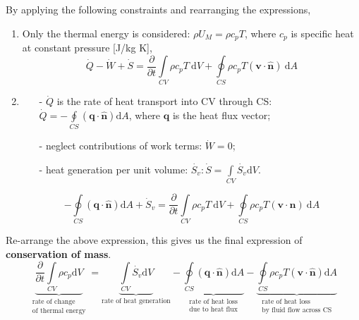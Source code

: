 \documentclass[12pt, a4paper]{article}
\begin{document}
By applying the following constraints and rearranging the expressions,
\begin{enumerate}
    \item Only the thermal energy is considered: $\rho U_{M} = \rho c_{p} T$, where $c_{p}$ is specific heat at constant pressure [J/kg K],
    \[
        \dot{Q}-\dot{W}+\dot{S} = \frac{\partial}{\partial t} \int\limits_{CV} \rho c_p T \ \mathrm{d}V +  \oint\limits_{CS} \rho c_p T (\bm{v} \cdot \bm{\hat{n}}) \ \mathrm{d}A
    \]
    
    \item \begin{itemize}
        \item[-] $\dot{Q}$ is the rate of heat transport into CV through CS: $\displaystyle \dot{Q} = -\oint\limits_{CS}(\bm{q} \cdot \bm{\hat{n}}) \mathrm{d}A$, where $\bm{q}$ is the heat flux vector;
        \item[-] neglect contributions of work terms: $\dot{W}=0$;
        \item[-] heat generation per unit volume: $\displaystyle \dot{S_{v}}: \dot{S} = \int\limits_{CV}\dot{S_{v}} \mathrm{d}V$.
    \end{itemize}
    \[
        -\oint\limits_{CS}(\bm{q} \cdot \bm{\hat{n}}) \mathrm{d}A+\dot{S}_v = \frac{\partial}{\partial t} \int\limits_{CV} \rho c_p T \ \mathrm{d}V +  \oint\limits_{CS} \rho c_p T (\bm{v} \cdot \bm{n}) \ \mathrm{d}A
    \]
\end{enumerate}

Re-arrange the above expression, this gives us the final expression of \textbf{conservation of mass}.
\begin{equation}
\label{eqn:mass_conserve}
    \boxed{ 
    \underbrace{\frac{\partial}{\partial t} \int\limits_{CV} \rho c_{p} \mathrm{d}V}_{\substack{\text{rate of change}\\\text{of thermal energy}}} 
    = \underbrace{\int\limits_{CV} \dot{S_{v}} \mathrm{d}V}_{\text{rate of heat generation}} 
    - \underbrace{\oint\limits_{CS} (\bm{q} \cdot \bm{\hat{n}}) \mathrm{d}A}_{\substack{\text{rate of heat loss}\\\text{due to heat flux}}} 
    - \underbrace{\oint\limits_{CS} \rho c_{p} T (\bm{v} \cdot \bm{\hat{n}}) \mathrm{d}A}_{\substack{\text{rate of heat loss}\\ \text{by fluid flow across CS}}} 
}
\end{equation}
 
 
\end{document}

